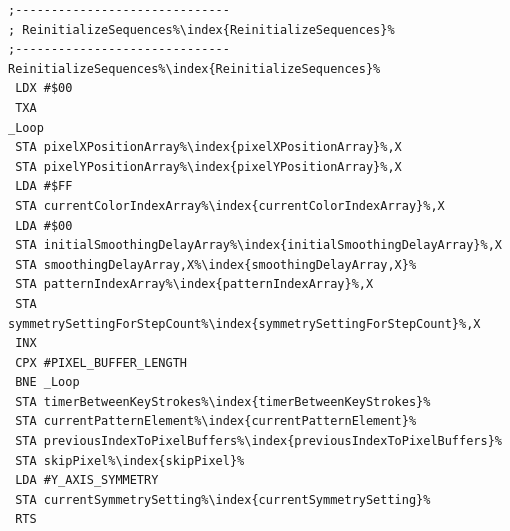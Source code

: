 \begin{minipage}[b]{0.33\linewidth}
\begin{lrbox}{\mybox}
\begin{lstlisting}[basicstyle=\ttfamily\tiny,escapechar=\%]
;------------------------------
; ReinitializeSequences%\index{ReinitializeSequences}%
;------------------------------
ReinitializeSequences%\index{ReinitializeSequences}%
 LDX #$00
 TXA
_Loop   
 STA pixelXPositionArray%\index{pixelXPositionArray}%,X
 STA pixelYPositionArray%\index{pixelYPositionArray}%,X
 LDA #$FF
 STA currentColorIndexArray%\index{currentColorIndexArray}%,X
 LDA #$00
 STA initialSmoothingDelayArray%\index{initialSmoothingDelayArray}%,X
 STA smoothingDelayArray,X%\index{smoothingDelayArray,X}%
 STA patternIndexArray%\index{patternIndexArray}%,X
 STA symmetrySettingForStepCount%\index{symmetrySettingForStepCount}%,X
 INX
 CPX #PIXEL_BUFFER_LENGTH
 BNE _Loop
 STA timerBetweenKeyStrokes%\index{timerBetweenKeyStrokes}%
 STA currentPatternElement%\index{currentPatternElement}%
 STA previousIndexToPixelBuffers%\index{previousIndexToPixelBuffers}%
 STA skipPixel%\index{skipPixel}%
 LDA #Y_AXIS_SYMMETRY
 STA currentSymmetrySetting%\index{currentSymmetrySetting}%
 RTS
\end{lstlisting}
\end{lrbox}%
\scalebox{0.8}{\usebox{\mybox}}
\end{minipage}
\hspace{-0.1cm}

